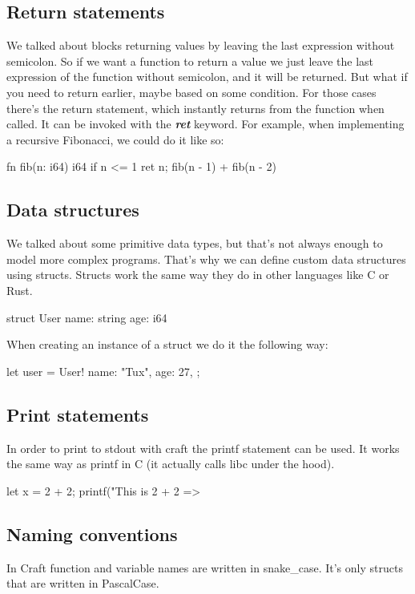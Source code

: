 ﻿\documentclass[10pt,a4paper,twocolumn,twoside]{article}
\begin{document}
\subsection{Return statements}
We talked about blocks returning values by leaving the last expression without
semicolon. So if we want a function to return a value we just leave the last
expression of the function without semicolon, and it will be returned. But what
if you need to return earlier, maybe based on some condition. For those cases
there's the return statement, which instantly returns from the function when
called. It can be invoked with the \textbf{\textit{ret}} keyword. For example,
when implementing a recursive Fibonacci, we could do it like so:

\begin{code}
fn fib(n: i64) i64 {
    if n <= 1 {
        ret n;
    }
    fib(n - 1) + fib(n - 2)
}
\end{code}

\subsection{Data structures}
We talked about some primitive data types, but that's not always enough to model
more complex programs. That's why we can define custom data structures using 
structs. Structs work the same way they do in other languages like C or Rust.

\begin{code}
struct User {
    name: string
    age: i64
}
\end{code}

When creating an instance of a struct we do it the following way:

\begin{code}
    let user = User!{
        name: "Tux",
        age: 27,
    };
\end{code}

\subsection{Print statements}
In order to print to stdout with craft the printf statement can be used. It
works the same way as printf in C (it actually calls libc under the hood).

\begin{code}
    let x = 2 + 2;
    printf("This is 2 + 2 => %
\end{code}

\subsection{Naming conventions}
In Craft function and variable names are written in snake\_case. It's 
only structs that are written in PascalCase.
\end{document}
